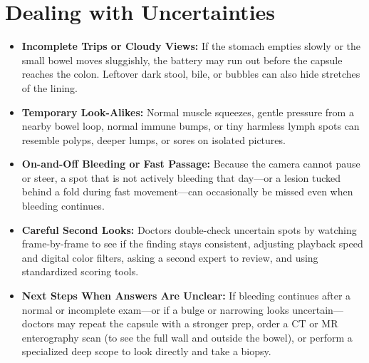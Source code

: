 \section{Dealing with Uncertainties}
\begin{itemize}
    \item \textbf{Incomplete Trips or Cloudy Views:} If the stomach empties slowly or the small bowel moves sluggishly, the battery may run out before the capsule reaches the colon. Leftover dark stool, bile, or bubbles can also hide stretches of the lining.
    \item \textbf{Temporary Look-Alikes:} Normal muscle squeezes, gentle pressure from a nearby bowel loop, normal immune bumps, or tiny harmless lymph spots can resemble polyps, deeper lumps, or sores on isolated pictures.
    \item \textbf{On-and-Off Bleeding or Fast Passage:} Because the camera cannot pause or steer, a spot that is not actively bleeding that day---or a lesion tucked behind a fold during fast movement---can occasionally be missed even when bleeding continues.
    \item \textbf{Careful Second Looks:} Doctors double-check uncertain spots by watching frame-by-frame to see if the finding stays consistent, adjusting playback speed and digital color filters, asking a second expert to review, and using standardized scoring tools.
    \item \textbf{Next Steps When Answers Are Unclear:} If bleeding continues after a normal or incomplete exam---or if a bulge or narrowing looks uncertain---doctors may repeat the capsule with a stronger prep, order a CT or MR enterography scan (to see the full wall and outside the bowel), or perform a specialized deep scope to look directly and take a biopsy.
\end{itemize}


